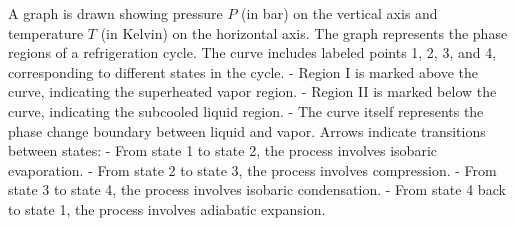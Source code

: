A graph is drawn showing pressure \( P \) (in bar) on the vertical axis and temperature \( T \) (in Kelvin) on the horizontal axis. The graph represents the phase regions of a refrigeration cycle. The curve includes labeled points 1, 2, 3, and 4, corresponding to different states in the cycle.  
- Region I is marked above the curve, indicating the superheated vapor region.  
- Region II is marked below the curve, indicating the subcooled liquid region.  
- The curve itself represents the phase change boundary between liquid and vapor.  
Arrows indicate transitions between states:  
- From state 1 to state 2, the process involves isobaric evaporation.  
- From state 2 to state 3, the process involves compression.  
- From state 3 to state 4, the process involves isobaric condensation.  
- From state 4 back to state 1, the process involves adiabatic expansion.